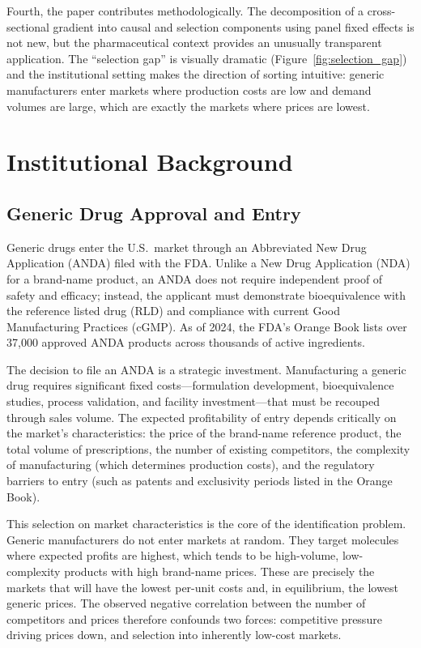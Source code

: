 \documentclass[12pt]{article}
\begin{document}
Fourth, the paper contributes methodologically. The decomposition of a cross-sectional gradient into causal and selection components using panel fixed effects is not new, but the pharmaceutical context provides an unusually transparent application. The ``selection gap'' is visually dramatic (Figure~\ref{fig:selection_gap}) and the institutional setting makes the direction of sorting intuitive: generic manufacturers enter markets where production costs are low and demand volumes are large, which are exactly the markets where prices are lowest.



\section{Institutional Background}\label{sec:background}

\subsection{Generic Drug Approval and Entry}

Generic drugs enter the U.S.\ market through an Abbreviated New Drug Application (ANDA) filed with the FDA. Unlike a New Drug Application (NDA) for a brand-name product, an ANDA does not require independent proof of safety and efficacy; instead, the applicant must demonstrate bioequivalence with the reference listed drug (RLD) and compliance with current Good Manufacturing Practices (cGMP). As of 2024, the FDA's Orange Book lists over 37,000 approved ANDA products across thousands of active ingredients.

The decision to file an ANDA is a strategic investment. Manufacturing a generic drug requires significant fixed costs---formulation development, bioequivalence studies, process validation, and facility investment---that must be recouped through sales volume. The expected profitability of entry depends critically on the market's characteristics: the price of the brand-name reference product, the total volume of prescriptions, the number of existing competitors, the complexity of manufacturing (which determines production costs), and the regulatory barriers to entry (such as patents and exclusivity periods listed in the Orange Book).

This selection on market characteristics is the core of the identification problem. Generic manufacturers do not enter markets at random. They target molecules where expected profits are highest, which tends to be high-volume, low-complexity products with high brand-name prices. These are precisely the markets that will have the lowest per-unit costs and, in equilibrium, the lowest generic prices. The observed negative correlation between the number of competitors and prices therefore confounds two forces: competitive pressure driving prices down, and selection into inherently low-cost markets.
\end{document}

